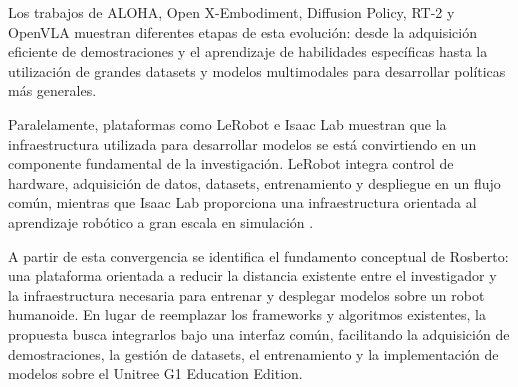 \documentclass[stu,12pt,floatsintext]{apa7}
\begin{document}
Los trabajos de ALOHA, Open X-Embodiment, Diffusion Policy, RT-2 y OpenVLA muestran diferentes etapas de esta evolución: desde la adquisición eficiente de demostraciones y el aprendizaje de habilidades específicas hasta la utilización de grandes datasets y modelos multimodales para desarrollar políticas más generales.

Paralelamente, plataformas como LeRobot e Isaac Lab muestran que la infraestructura utilizada para desarrollar modelos se está convirtiendo en un componente fundamental de la investigación. LeRobot integra control de hardware, adquisición de datos, datasets, entrenamiento y despliegue en un flujo común, mientras que Isaac Lab proporciona una infraestructura orientada al aprendizaje robótico a gran escala en simulación \parencite{cadene2026lerobotopensourcelibraryendtoend}.

A partir de esta convergencia se identifica el fundamento conceptual de Rosberto: una plataforma orientada a reducir la distancia existente entre el investigador y la infraestructura necesaria para entrenar y desplegar modelos sobre un robot humanoide. En lugar de reemplazar los frameworks y algoritmos existentes, la propuesta busca integrarlos bajo una interfaz común, facilitando la adquisición de demostraciones, la gestión de datasets, el entrenamiento y la implementación de modelos sobre el Unitree G1 Education Edition.

\clearpage







\end{document}
